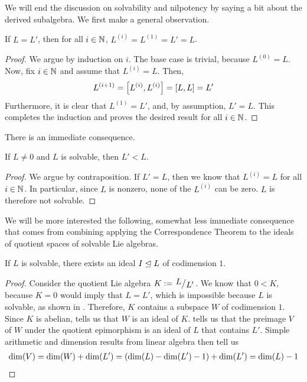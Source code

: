 \begin{boxcexample}
    \sorry
\end{boxcexample}

We will end the discussion on solvability and nilpotency by saying a bit about the derived subalgebra. We first make a general observation.

\begin{boxlemma}\label{Ch1:Lemma:AllDerivsOfDerivEqTop}
    If $L = L'$, then for all $i \in \mathbb{N}$, $L^{(i)} = L^{(1)} = L' = L$.
\end{boxlemma}
\begin{proof}
    We argue by induction on $i$. The base case is trivial, because $L^{(0)} = L$. Now, fix $i \in \mathbb{N}$ and assume that $L^{(i)} = L$. Then,
    \begin{align*}
        L^{(i + 1)} = \left[ L^{(i)}, L^{(i)} \right] = \left[ L, L \right] = L'
    \end{align*}
    Furthermore, it is clear that $L^{(1)} = L'$, and, by assumption, $L' = L$. This completes the induction and proves the desired result for all $i \in \mathbb{N}$.
\end{proof}

There is an immediate consequence.

\begin{corollary}\label{Ch1:Cor:DerivedSubalgLtOfSolvable}
    If $L \neq 0$ and $L$ is solvable, then $L' < L$.
\end{corollary}
\begin{proof}
    We argue by contraposition. If $L' = L$, then we know that $L^{(i)} = L$ for all $i \in \mathbb{N}$. In particular, since $L$ is nonzero, none of the $L^{(i)}$ can be zero. $L$ is therefore not solvable.
\end{proof}

We will be more interested the following, somewhat less immediate consequence that comes from combining applying the Correspondence Theorem to the ideals of quotient spaces of solvable Lie algebras.

\begin{boxproposition}\label{Ch1:Prop:ExistsIdealCodim1}
If $L$ is solvable, there exists an ideal $I \trianglelefteq L$ of codimension $1$.
\end{boxproposition}
\begin{proof}
    Consider the quotient Lie algebra $K := \quotient{L}{L'}$. We know that $0 < K$, because $K = 0$ would imply that $L = L'$, which is impossible because $L$ is solvable, as shown in . Therefore, $K$ contains a subspace $W$ of codimension $1$. Since $K$ is abelian,  tells us that $W$ is an ideal of $K$.  tells us that the preimage $V$ of $W$ under the quotient epimorphism is an ideal of $L$ that contains $L'$. Simple arithmetic and dimension results from linear algebra then tell us
    \begin{align*}
        \dim\!\left( V \right) = \dim\!\left( W \right) + \dim\!\left( L' \right) = \left( \dim\!\left( L \right) - \dim\!\left( L' \right) - 1 \right) + \dim\!\left( L' \right) = \dim\!\left( L \right) - 1
    \end{align*}
\end{proof}


